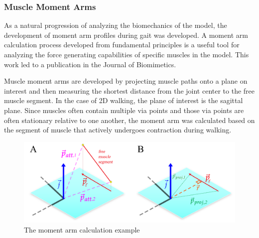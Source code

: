 \documentclass[runningheads,a4paper]{llncs}
\begin{document}
	\subsubsection{Muscle Moment Arms}
		As a natural progression of analyzing the biomechanics of the model, the development of moment arm profiles during gait was developed. A moment arm calculation process developed from fundamental principles is a useful tool for analyzing the force generating capabilities of specific muscles in the model. This work led to a publication in the Journal of Biomimetics\cite{young_analyzing_2019}. \par
		Muscle moment arms are developed by projecting muscle paths onto a plane on interest and then measuring the shortest distance from the joint center to the free muscle segment. In the case of 2D walking, the plane of interest is the sagittal plane. Since muscles often contain multiple via points and those via points are often stationary relative to one another, the moment arm was calculated based on the segment of muscle that actively undergoes contraction during walking.
			\begin{figure}
				\centering
				\includegraphics[width=.8\textwidth]{Figures/momarm1.png}
				\caption{The moment arm calculation example}
				\label{fig:momentarmexample}
			\end{figure}
\end{document}
